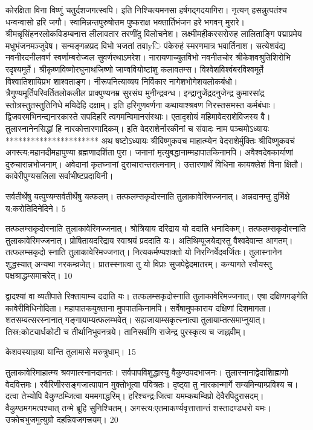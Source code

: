 कोरक्षिता विना विष्णुं चतुर्दशजगत्स्वपि।
इति निश्चित्यमनसा हर्षगद्गदयागिरा।
नृत्यन् हसन्नुत्पतंश्च धन्वन्वासो हरि जगौ।
स्वामिन्नन्तपुरुषोत्तम पुष्कराक्ष
भक्तार्तिभंजन हरे भगवन् मुरारे।
श्रीमन्नृसिंहनरलोकविडम्बनात्त
लीलावतार तरणींदु विलोचनेश।
लक्ष्मीमहीकरसरोरुह लालिताङ्गि
पद्माप्रमेय मधुभंजनमञ्जुवेष।
सन्मङ्गळप्रद विभो भजतां तवाyि
पंकेरुहं स्मरणमात्र भवार्तिनाश।
सत्येशवंद्य नवनीरदनीलवर्ण
स्वर्णाम्बरोज्वल सुवर्णरथाऽमरेश।
नारायणाच्युतविभो नवनीतचोर
श्रीकेशवश्रुतिशिरोभि रदृश्यमूर्ते।
श्रीकृष्णविष्णोरघुनाथजिष्णो
जाण्ववियोष्टांशु कलावतम्स।
विश्वेशविश्वंबरविश्वमूर्ते
विश्वातिशायिप्रभ शाश्वताङ्ग।
नीरूपनित्याव्यय निर्विकार
नागेशभोगेशयलोकबंधो।
त्रैगुण्यमूर्तिपरिवर्तितलोकलील
प्राक्पुण्यनम्र सुरसंघ मुनीन्द्रवन्ध।
इन्द्रानुजेंद्रदनुजेन्द्र कुमारसांद्र
स्तोत्रस्तुतस्तुतिनिधे मयिदेहि दक्षाम्।
इति हरिगुणवर्णना कथायाश्श्रवण
निरस्तसमस्त कर्मबंधाः।
द्विजवरमभिनन्द्यनारकास्ते
सपदिहरि त्वगमन्विमानसंस्थाः।
एतादृशोयं महिमावेदराशेविजस्य वै।
तुलास्नानेनसिद्धां हि नारकोत्तारणादिकम्।
इति वेदराशेर्नारकीनां च संवादः नाम
पञ्चमोऽध्यायः
**********************
अथ षष्टोऽध्यायः श्रीविष्णुकवच माहात्म्येन वेदराशेर्मुक्तिः
श्रीविष्णुकवचं अगस्त्य:महानदीमहापुण्या ब्रह्मणादर्शिता पुरा।
जनानां मृत्युबद्धानाम्महापातकिनामपि।
अवैश्वदेवकार्याणां दुरुचारान्नभोजनाम्।
अवेदानां कृतघ्नानां दुराचारान्तरात्मनाम्।
उत्तारणार्थं विधिना कायक्लेशं विना क्षितौ।
कावेरीपुण्यसलिला सर्वाभीष्टप्रदायिनी।

सर्वतीर्थेषु यत्पुण्यम्सर्वतीर्थेषु यत्फलम्।
तत्फलम्सकृदोस्नाति तुलाकावेरिमज्जनात्।
अन्नदानम्तु दुर्भिक्षे य:करोतिदिनेदिने।
5

तत्फलम्सकृदोस्नाति तुलाकावेरिमज्जनात्।
श्रोत्रियाय दरिद्राय यो ददाति धनादिकम्।
तत्फलम्सकृदोस्नाति तुलाकावेरिमज्जनात्।
प्रोषितायदरिद्राय स्वाश्रयं प्रददाति यः।
अतिथिम्पूजयेद्यस्तु वैश्वदेवान्त आगतम्।
तत्फलम्सकृदो स्नाति तुलाकावेरिमज्जनात्।
नित्यकर्मण्यशक्तो यो निरग्निर्वेदवर्जितः।
तुलास्नानेन शुद्धस्यात् अन्यथा नरकम्व्रजेत्।
प्रातस्स्नात्वा तु यो विप्राः सुजपेद्वेदमातरम्।
कन्यागते रवौयस्तु पक्षश्राद्धम्समाचरेत्।
10

द्वादश्यां वा व्यतीपाते रिक्तायाम्च ददाति यः।
तत्फलम्सकृदोस्नाति तुलाकावेरिमज्जनात्।
एषा दक्षिणगङ्गेति कावेरीविधिनोदिता।
महापातकयुक्ताना मुपपातकिनामपि।
सर्वेषामुपकाराय दक्षिणां दिशमागता।
शतसम्वत्सरस्नानात् गङ्गायाम्यत्फलम्भवेत्।
सह्यजायाम्सकृत्स्नात्वा तुलायाम्तत्समाप्नुयात्।
तिस्र:कोट्यार्धकोटी च तीर्थानिभुवनत्रये।
तानिसर्वाणि राजेन्द्र पुरस्कृत्य च जाह्नवीम्।

केशवस्याज्ञया यान्ति तुलामासे मरुत्रुधाम्।
15

तुलाकावेरिमाहात्म्य श्रवणात्स्नानदानतः।
सर्वपापविशुद्धास्यु वैकुण्ठपदभाजनः।
तुलास्नानाद्वेदाशिाह्मणो वेदवित्तमः।
स्वैरिणीस्सङ्गजात्पापान मुक्तोभूत्वा पवित्रतः।
दृष्ट्वा तु नारकान्मार्गे सम्यमिन्याम्प्रविश्य च।
दत्वा तेभ्योपि वैकुण्ठम्जित्वा यममगाद्धरिम्।
हरिश्चन्द्र:जित्वा यमम्कथम्विप्रो देवैरपिदुरासदम्।
वैकुण्ठमगमत्पश्चात् तन्मे ब्रूहि सुनिश्चितम्।
अगस्त्य:एतमाकर्ण्यवृत्तात्तान्तं शस्तादण्डधरो यमः।
उक्रोचभुजमुत्युग्रो दहन्निवजगत्त्रयम्।
20

